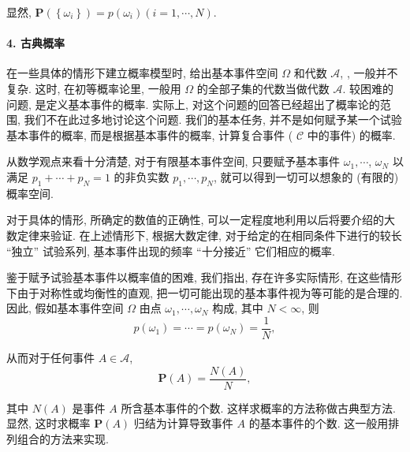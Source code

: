 显然, $\mathbf{P}\left(\left\{\omega_i\right\}\right)=p\left(\omega_i\right)(i=1, \cdots, N)$. 

\paragraph{4. 古典概率}在一些具体的情形下建立概率模型时, 给出基本事件空间 $\Omega$ 和代数 $\mathscr{A}$, , 一般并不复杂. 这时, 在初等概率论里, 一般用 $\Omega$ 的全部子集的代数当做代数 $\mathscr{A}$. 较困难的问题, 是定义基本事件的概率. 实际上, 对这个问题的回答已经超出了概率论的范围, 我们不在此过多地讨论这个问题. 我们的基本任务, 并不是如何赋予某一个试验基本事件的概率, 而是根据基本事件的概率, 计算复合事件 ( $\mathscr{C}$ 中的事件) 的概率.

从数学观点来看十分清楚, 对于有限基本事件空间, 只要赋予基本事件 $\omega_1, \cdots$, $\omega_N$ 以满足 $p_1+\cdots+p_N=1$ 的非负实数 $p_1, \cdots, p_N$, 就可以得到一切可以想象的 (有限的) 概率空间.

对于具体的情形, 所确定的数值的正确性, 可以一定程度地利用以后将要介绍的大数定律来验证. 在上述情形下, 根据大数定律, 对于给定的在相同条件下进行的较长 “独立” 试验系列, 基本事件出现的频率 “十分接近” 它们相应的概率.

鉴于赋予试验基本事件以概率值的困难, 我们指出, 存在许多实际情形, 在这些情形下由于对称性或均衡性的直观, 把一切可能出现的基本事件视为等可能的是合理的. 因此, 假如基本事件空间 $\Omega$ 由点 $\omega_1, \cdots, \omega_N$ 构成, 其中 $N<\infty$, 则
$$
p\left(\omega_1\right)=\cdots=p\left(\omega_N\right)=\frac{1}{N},
$$

从而对于任何事件 $A \in \mathscr{A}$,
$$
\mathbf{P}(A)=\frac{N(A)}{N},
$$

其中 $N(A)$ 是事件 $A$ 所含基本事件的个数.
这样求概率的方法称做古典型方法. 显然, 这时求概率 $\mathbf{P}(A)$ 归结为计算导致事件 $A$ 的基本事件的个数. 这一般用排列组合的方法来实现. 